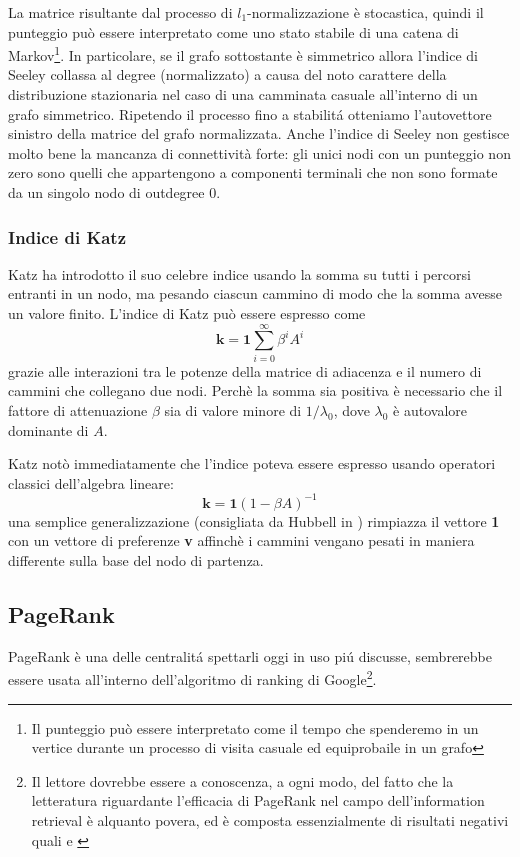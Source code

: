 La matrice risultante dal processo di $l_1$-normalizzazione è stocastica, quindi il punteggio può essere interpretato come uno stato stabile di una catena di Markov\footnote{Il punteggio può essere interpretato come il tempo che spenderemo in un vertice durante un processo di visita casuale ed equiprobaile in un grafo}. In particolare, se il grafo sottostante è simmetrico allora l'indice di Seeley collassa al degree (normalizzato) a causa del noto carattere della distribuzione stazionaria nel caso di una camminata casuale all'interno di un grafo simmetrico. Ripetendo il processo fino a stabilitá otteniamo l'autovettore sinistro della matrice del grafo normalizzata.
Anche l'indice di Seeley non gestisce molto bene la mancanza di connettività forte: gli unici nodi con un punteggio non zero sono quelli che appartengono a componenti terminali che non sono formate da un singolo nodo di outdegree 0.
\subsubsection{Indice di Katz}
Katz ha introdotto il suo celebre indice \cite{katz} usando la somma su tutti i percorsi entranti in un nodo, ma pesando ciascun cammino di modo che la somma avesse un valore finito. L'indice di Katz può essere espresso come
\begin{equation}
    \textbf{k} = \textbf{1} \sum_{i = 0}^{\infty}{\beta^i A^i}
\end{equation}
grazie alle interazioni tra le potenze della matrice di adiacenza e il numero di cammini che collegano due nodi. Perchè la somma sia positiva è necessario che il fattore di attenuazione $\beta$ sia di valore minore di $1 / \lambda_0$, dove $\lambda_0$ è autovalore dominante di $A$.

Katz notò immediatamente che l'indice poteva essere espresso usando operatori classici dell'algebra lineare:
\begin{equation}
    \textbf{k} = \textbf{1}(1 - \beta A)^{-1}
\end{equation}
una semplice generalizzazione (consigliata da Hubbell in \cite{hub}) rimpiazza il vettore \textbf{1} con un vettore di preferenze \textbf{v} affinchè i cammini vengano pesati in maniera differente sulla base del nodo di partenza.
\subsection{PageRank}
PageRank è una delle centralitá spettarli oggi in uso piú discusse, sembrerebbe essere usata all'interno dell'algoritmo di ranking di Google\footnote{Il lettore dovrebbe essere a conoscenza, a ogni modo, del fatto che la letteratura riguardante l'efficacia di PageRank nel campo dell'information retrieval è alquanto povera, ed è composta essenzialmente di risultati negativi quali \cite{prank} e \cite{prankoind}}.

